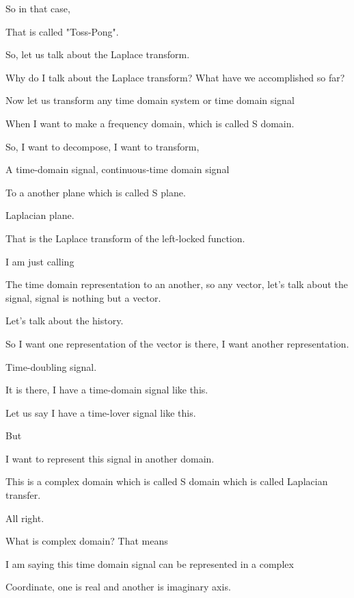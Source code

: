 \documentclass{article}
\begin{document}
So in that case,

That is called "Toss-Pong".

So, let us talk about the Laplace transform.

Why do I talk about the Laplace transform? What have we accomplished so far?

Now let us transform any time domain system or time domain signal

When I want to make a frequency domain, which is called S domain.

So, I want to decompose, I want to transform,

A time-domain signal, continuous-time domain signal

To a another plane which is called S plane.

Laplacian plane.

That is the Laplace transform of the left-locked function.

I am just calling

The time domain representation to an another, so any vector, let's talk about the signal, signal is nothing but a vector.

Let's talk about the history.

So I want one representation of the vector is there, I want another representation.

Time-doubling signal.

It is there, I have a time-domain signal like this.

Let us say I have a time-lover signal like this.

But

I want to represent this signal in another domain.

This is a complex domain which is called S domain which is called Laplacian transfer.

All right.

What is complex domain? That means

I am saying this time domain signal can be represented in a complex

Coordinate, one is real and another is imaginary axis.
\end{document}
